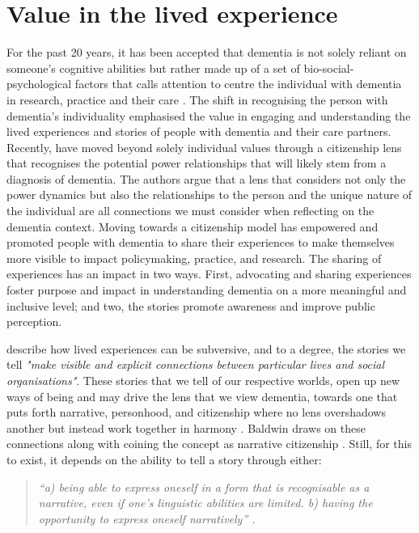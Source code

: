 \section{Value in the lived experience}
\label{Method:experience}
For the past 20 years, it has been accepted that dementia is not solely reliant on someone's cognitive abilities but rather made up of a set of bio-social-psychological factors that calls attention to centre the individual with dementia in research, practice and their care \citep{dewing_personhood_2008}. The shift in recognising the person with dementia's individuality emphasised the value in engaging and understanding the lived experiences and stories of people with dementia and their care partners. Recently, \cite{bartlett_personhood_2007} have moved beyond solely individual values through a citizenship lens that recognises the potential power relationships that will likely stem from a diagnosis of dementia. The authors argue that a lens that considers not only the power dynamics but also the relationships to the person and the unique nature of the individual are all connections we must consider when reflecting on the dementia context. Moving towards a citizenship model has empowered and promoted people with dementia to share their experiences to make themselves more visible to impact policymaking, practice, and research. The sharing of experiences has an impact in two ways. First, advocating and sharing experiences foster purpose and impact in understanding dementia on a more meaningful and inclusive level; and two, the stories promote awareness and improve public perception.

\cite{ewick_subversive_1995} describe how lived experiences can be subversive, and to a degree, the stories we tell \textit{"make visible and explicit connections between particular lives and social organisations"}. These stories that we tell of our respective worlds, open up new ways of being and may drive the lens that we view dementia, towards one that puts forth narrative, personhood, and citizenship where no lens overshadows another but instead work together in harmony \citep{dupuis_re-claiming_2016}. Baldwin draws on these connections along with coining the concept as narrative citizenship \citep{baldwin_narrative_2008}. Still, for this to exist, it depends on the ability to tell a story through either:
\begin{quote}
\textit{ ``a) being able to express oneself in a form that is recognisable as a narrative, even if one's linguistic abilities are limited. 
b) having the opportunity to express oneself narratively'' \citep{baldwin_narrative_2008}.  }
\end{quote}

